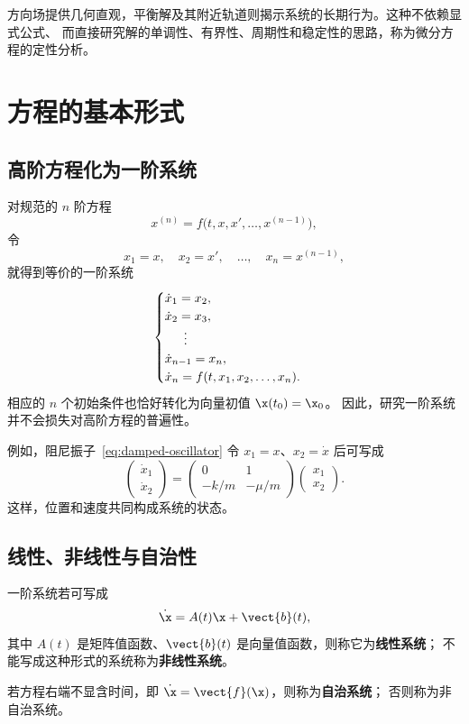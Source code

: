方向场提供几何直观，平衡解及其附近轨道则揭示系统的长期行为。这种不依赖显式公式、
而直接研究解的单调性、有界性、周期性和稳定性的思路，称为微分方程的定性分析。

\section{方程的基本形式}

\subsection*{高阶方程化为一阶系统}

对规范的 $n$ 阶方程
\[
	x^{(n)}=f\bigl(t,x,x',\ldots,x^{(n-1)}\bigr),
\]
令
\[
	x_1=x,\quad x_2=x',\quad\ldots,\quad x_n=x^{(n-1)},
\]
就得到等价的一阶系统
\[
	\begin{cases}
		\dot{x}_1=x_2,\\
		\dot{x}_2=x_3,\\
		\hspace{1.5em}\vdots\\
		\dot{x}_{n-1}=x_n,\\
		\dot{x}_n=f(t,x_1,x_2,\ldots,x_n).
	\end{cases}
\]
相应的 $n$ 个初始条件也恰好转化为向量初值 $\x(t_0)=\x_0$。
因此，研究一阶系统并不会损失对高阶方程的普遍性。

例如，阻尼振子~\eqref{eq:damped-oscillator} 令 $x_1=x$、$x_2=\dot x$ 后可写成
\[
	\begin{pmatrix}\dot x_1\\ \dot x_2\end{pmatrix}
	=
	\begin{pmatrix}
		0 & 1\\
		-k/m & -\mu/m
	\end{pmatrix}
	\begin{pmatrix}x_1\\x_2\end{pmatrix}.
\]
这样，位置和速度共同构成系统的状态。

\subsection*{线性、非线性与自治性}

\begin{definition}
一阶系统若可写成
\[
	\dot{\x}=A(t)\x+\vect{b}(t),
\]
其中 $A(t)$ 是矩阵值函数、$\vect{b}(t)$ 是向量值函数，则称它为\textbf{线性系统}；
不能写成这种形式的系统称为\textbf{非线性系统}。

若方程右端不显含时间，即 $\dot{\x}=\vect{f}(\x)$，则称为\textbf{自治系统}；
否则称为非自治系统。
\end{definition}

